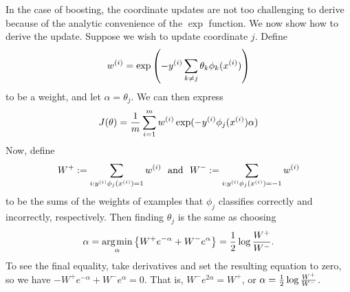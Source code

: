 \documentclass{article}
\newcommand{\represent}{\phi}
\begin{document}
In the case of boosting, the coordinate updates are not too challenging to
derive because of the analytic convenience of the $\exp$ function.
We now show how to derive the update. Suppose we wish to update
coordinate $j$. Define
\begin{equation*}
  w^{(i)} = \exp\left(-\ysi \sum_{k \neq j} \theta_k \represent_k(\xsi)\right)
\end{equation*}
to be a weight, and let $\alpha = \theta_j$. We can then express
\begin{equation*}
  J(\theta) = \frac{1}{m} \sum_{i = 1}^m w^{(i)} \exp(-\ysi \represent_j(\xsi) \alpha)
\end{equation*}
Now, define
\begin{equation*}
  W^+ \defeq \sum_{i : \ysi \represent_j(\xsi) = 1} w^{(i)}
  ~~ \mbox{and} ~~
  W^- \defeq \sum_{i : \ysi \represent_j(\xsi) = -1} w^{(i)}
\end{equation*}
to be the sums of the weights of examples that $\represent_j$ classifies correctly
and incorrectly, respectively. Then finding $\theta_j$ is the same as choosing
\begin{equation*}
  \alpha = \mathop{\rm arg\hspace{.1em}min}_{\alpha} \left\{ W^+ e^{-\alpha}
  + W^- e^\alpha \right\}
  = \frac{1}{2} \log \frac{W^+}{W^-}.
\end{equation*}
To see the final equality, take derivatives and set the resulting
equation to zero, so we have $-W^+ e^{-\alpha} +
W^- e^\alpha = 0$.  That is, $W^- e^{2\alpha} = W^+$, or $\alpha = \frac{1}{2} \log
\frac{W^+}{W^-}$.
\end{document}
